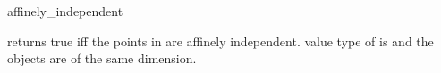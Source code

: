 \ccHtmlNoRefLinks
\begin{ccRefFunction}{affinely_independent}
\ccHtmlNoLinks

{returns true iff the points in \ccc{A = tuple [first,last)} are 
affinely independent.
\ccPrecond value type of  is 
and the objects are of the same dimension.}

\end{ccRefFunction}

